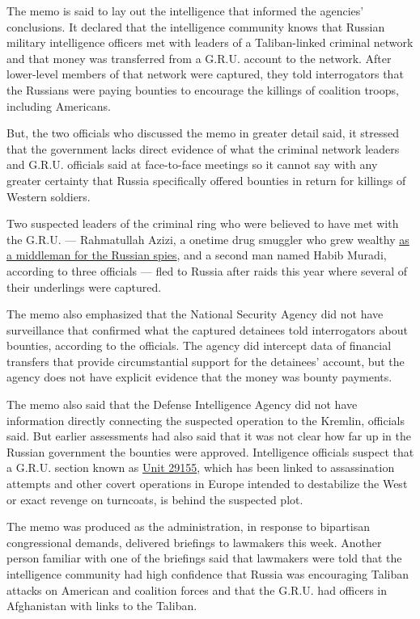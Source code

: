 The memo is said to lay out the intelligence that informed the agencies'
conclusions. It declared that the intelligence community knows that
Russian military intelligence officers met with leaders of a
Taliban-linked criminal network and that money was transferred from a
G.R.U. account to the network. After lower-level members of that network
were captured, they told interrogators that the Russians were paying
bounties to encourage the killings of coalition troops, including
Americans.

But, the two officials who discussed the memo in greater detail said, it
stressed that the government lacks direct evidence of what the criminal
network leaders and G.R.U. officials said at face-to-face meetings so it
cannot say with any greater certainty that Russia specifically offered
bounties in return for killings of Western soldiers.

Two suspected leaders of the criminal ring who were believed to have met
with the G.R.U. --- Rahmatullah Azizi, a onetime drug smuggler who grew
wealthy
\href{https://www.nytimes.com/2020/07/01/world/asia/afghan-russia-bounty-middleman.html}{as
a middleman for the Russian spies}, and a second man named Habib Muradi,
according to three officials --- fled to Russia after raids this year
where several of their underlings were captured.

The memo also emphasized that the National Security Agency did not have
surveillance that confirmed what the captured detainees told
interrogators about bounties, according to the officials. The agency did
intercept data of financial transfers that provide circumstantial
support for the detainees' account, but the agency does not have
explicit evidence that the money was bounty payments.

The memo also said that the Defense Intelligence Agency did not have
information directly connecting the suspected operation to the Kremlin,
officials said. But earlier assessments had also said that it was not
clear how far up in the Russian government the bounties were approved.
Intelligence officials suspect that a G.R.U. section known as
\href{https://www.nytimes.com/2019/10/08/world/europe/unit-29155-russia-gru.html}{Unit
29155}, which has been linked to assassination attempts and other covert
operations in Europe intended to destabilize the West or exact revenge
on turncoats, is behind the suspected plot.

The memo was produced as the administration, in response to bipartisan
congressional demands, delivered briefings to lawmakers this week.
Another person familiar with one of the briefings said that lawmakers
were told that the intelligence community had high confidence that
Russia was encouraging Taliban attacks on American and coalition forces
and that the G.R.U. had officers in Afghanistan with links to the
Taliban.

